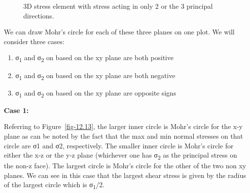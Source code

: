 \documentclass[
  letterpaper,
  DIV=11,
  numbers=noendperiod]{scrreprt}
\theoremstyle{definition}
\theoremstyle{remark}
\begin{document}
\begin{figure}


\caption{\label{fig-12.12}3D stress element with stress acting in only 2
or the 3 principal directions.}

\end{figure}%

We can draw Mohr's circle for each of these three planes on one plot. We
will consider three cases:

\begin{enumerate}
\def\labelenumi{\arabic{enumi}.}
\item
  σ\textsubscript{1} and σ\textsubscript{2} on based on the xy plane are
  both positive
\item
  σ\textsubscript{1} and σ\textsubscript{2} on based on the xy plane are
  both negative
\item
  σ\textsubscript{1} and σ\textsubscript{2} on based on the xy plane are
  opposite signs
\end{enumerate}

\textbf{Case 1:}

Referring to Figure~\ref{fig-12.13}, the larger inner circle is Mohr's
circle for the x-y plane as can be noted by the fact that the max and
min normal stresses on that circle are σ1 and σ2, respectively. The
smaller inner circle is Mohr's circle for either the x-z or the y-z
plane (whichever one has σ\textsubscript{2} as the principal stress on
the non-z face). The largest circle is Mohr's circle for the other of
the two non xy planes. We can see in this case that the largest shear
stress is given by the radius of the largest circle which is
σ\textsubscript{1}/2.
\end{document}
